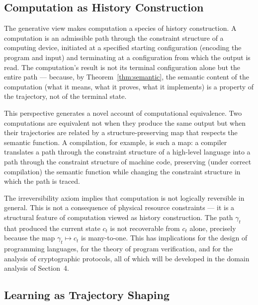 \documentclass[12pt, twoside]{article}
\theoremstyle{plain}
\theoremstyle{definition}
\theoremstyle{remark}
\begin{document}
\subsection{Computation as History Construction}

The generative view makes computation a species of history construction.
A computation is an admissible path through the constraint structure
of a computing device, initiated at a specified starting configuration
(encoding the program and input) and terminating at a configuration
from which the output is read.
The computation's result is not its terminal configuration alone
but the entire path — because, by Theorem~\ref{thm:semantic},
the semantic content of the computation (what it means, what it proves,
what it implements) is a property of the trajectory,
not of the terminal state.

This perspective generates a novel account of computational equivalence.
Two computations are equivalent not when they produce the same output
but when their trajectories are related by a structure-preserving map
that respects the semantic function.
A compilation, for example, is such a map: a compiler translates a
path through the constraint structure of a high-level language into
a path through the constraint structure of machine code,
preserving (under correct compilation) the semantic function
while changing the constraint structure in which the path is traced.

The irreversibility axiom implies that computation is not logically
reversible in general.
This is not a consequence of physical resource constraints —
it is a structural feature of computation viewed as history
construction.
The path $\gamma_t$ that produced the current state $c_t$
is not recoverable from $c_t$ alone, precisely because the map
$\gamma_t \mapsto c_t$ is many-to-one.
This has implications for the design of programming languages,
for the theory of program verification, and for the analysis of
cryptographic protocols, all of which will be developed in
the domain analysis of Section~4.

\subsection{Learning as Trajectory Shaping}
\end{document}
